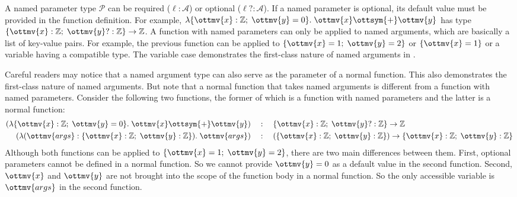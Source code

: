 A named parameter type $\mathcal{P}$ can be required ($\ell:\mathcal{A}$) or optional
($\ell?:\mathcal{A}$). If a named parameter is optional, its default value must be
provided in the function definition. For example,
$\lambda\{\ottmv{x}: \mathbb{Z} ;\;\ottmv{y}=0\}.\;\ottmv{x}  \ottsym{+}  \ottmv{y}$ has type
$\{\ottmv{x}: \mathbb{Z} ;\;\ottmv{y}?: \mathbb{Z} \} \rightarrow  \mathbb{Z} $. A function with named
parameters can only be applied to named arguments, which are basically a list of
key-value pairs. For example, the previous function can be applied to
$\{\ottmv{x}=1;\;\ottmv{y}=2\}$ or $\{\ottmv{x}=1\}$ or a variable having a compatible type.
The variable case demonstrates the first-class nature of named arguments in \uaena.

Careful readers may notice that a named argument type can also serve as the
parameter of a normal function. This also demonstrates the first-class nature of
named arguments. But note that a normal function that takes named
arguments is different from a function with named parameters. Consider the
following two functions, the former of which is a function with named parameters
and the latter is a normal function:
\begin{align*}
                    (\lambda\{\ottmv{x}: \mathbb{Z} ;\;\ottmv{y}=0\}.\;\ottmv{x}  \ottsym{+}  \ottmv{y}) \quad&:\quad \{\ottmv{x}: \mathbb{Z} ;\;\ottmv{y}?: \mathbb{Z} \} \rightarrow  \mathbb{Z}  \\
  (\lambda(\ottmv{args}:\{\ottmv{x}: \mathbb{Z} ;\;\ottmv{y}: \mathbb{Z} \}).\;\ottmv{args}) \quad&:\quad (\{\ottmv{x}: \mathbb{Z} ;\;\ottmv{y}: \mathbb{Z} \}) \rightarrow \{\ottmv{x}: \mathbb{Z} ;\;\ottmv{y}: \mathbb{Z} \}
\end{align*}
Although both functions can be applied to $\{\ottmv{x}=1;\;\ottmv{y}=2\}$, there are two
main differences between them. First, optional parameters cannot be defined in a
normal function. So we cannot provide $\ottmv{y}=0$ as a default value in the second
function. Second, $\ottmv{x}$ and $\ottmv{y}$ are not brought into the scope of the
function body in a normal function. So the only accessible variable is $\ottmv{args}$
in the second function.

\renewcommand{\IUdrulePElaXXOptional}[1]{\ottdrule[#1]{%
\ottpremise{ \Delta \,\vdash\, _{\!\!\!\! \ottmv{x} }\:\: \rho \ottsym{:} \mathcal{P} \,\rightsquigarrow\, \ottnt{letin} \,\dashv\, \Delta' }%
\ottpremise{\Delta'  \,\vdash\,  \epsilon  \ottsym{:}  \mathcal{A}  \,\rightsquigarrow\,  \ottnt{e}}%
}{
\Delta\,\vdash_{\!\ottmv{x}}\,\ottsym{(}  \rho  ;\,  \ell  \ottsym{=}  \epsilon  \ottsym{)}:\ottsym{(}  \mathcal{P}  ;\,  \ell  \ottsym{\mbox{?}}  \ottsym{:}  \mathcal{A}  \ottsym{)}\\
 \,\rightsquigarrow\,  \ottnt{letin} \circ \ottkw{let} \, \ell  \ottsym{=}  \ottkw{switch} \, \ottmv{x}  \ottsym{.}  \ell \, \ottkw{as} \, \ottmv{y} \, \ottkw{case} \, |  \mathcal{A}  |  \Rightarrow  \ottmv{y} \, \ottkw{case} \, \ottkw{Null}  \Rightarrow  \ottnt{e} \, \ottkw{in}  \,\dashv\, \Delta'  ,\,  \ell  \ottsym{:}  \mathcal{A}}{%
{\ottdrulename{PEla\_Optional}}{}%
}}

